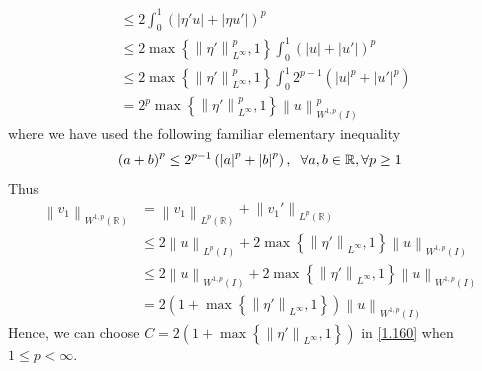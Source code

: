 \documentclass[a4paper,oneside]{book}
\numberwithin{equation}{chapter}
\begin{document}
\begin{enumerate}
\begin{align}
 &\le 2\int_0^1 {{{\left( {\left| {\eta 'u} \right| + \left| {\eta u'} \right|} \right)}^p}} \\
& \le 2\max \left\{ {\left\| {\eta '} \right\|_{{L^\infty }}^p,1} \right\}\int_0^1 {{{\left( {\left| u \right| + \left| {u'} \right|} \right)}^p}} \\
& \le 2\max \left\{ {\left\| {\eta '} \right\|_{{L^\infty }}^p,1} \right\}\int_0^1 {{2^{p - 1}}\left( {{{\left| u \right|}^p} + {{\left| {u'} \right|}^p}} \right)} \\
& = {2^p}\max \left\{ {\left\| {\eta '} \right\|_{{L^\infty }}^p,1} \right\}{\left\| u \right\|_{{W^{1,p}}\left( I \right)}^p}
\end{align}
where we have used the following familiar elementary inequality
\begin{align}
\label{1.185}
{\left( {a + b} \right)^p} \le {2^{p - 1}}\left( {{{\left| a \right|}^p} + {{\left| b \right|}^p}} \right),\hspace{0.2cm}\forall a,b \in \mathbb{R},\forall p \ge 1
\end{align}
Thus 
\begin{align}
{\left\| {{v_1}} \right\|_{{W^{1,p}}\left( \mathbb{R} \right)}} &= {\left\| {{v_1}} \right\|_{{L^p}\left( \mathbb{R} \right)}} + {\left\| {{v_1}'} \right\|_{{L^p}\left( \mathbb{R} \right)}}\\
& \le 2{\left\| u \right\|_{{L^p}\left( I \right)}} + 2\max \left\{ {{{\left\| {\eta '} \right\|}_{{L^\infty }}},1} \right\}{\left\| u \right\|_{{W^{1,p}}\left( I \right)}}\\
& \le 2{\left\| u \right\|_{{W^{1,p}}\left( I \right)}} + 2\max \left\{ {{{\left\| {\eta '} \right\|}_{{L^\infty }}},1} \right\}{\left\| u \right\|_{{W^{1,p}}\left( I \right)}}\\
& = 2\left( {1 + \max \left\{ {{{\left\| {\eta '} \right\|}_{{L^\infty }}},1} \right\}} \right){\left\| u \right\|_{{W^{1,p}}\left( I \right)}}
\end{align}
Hence, we can choose $C = 2\left( {1 + \max \left\{ {{{\left\| {\eta '} \right\|}_{{L^\infty }}},1} \right\}} \right)$ in \eqref{1.160} when $1\le p<\infty$.
\end{enumerate}
\end{document}
